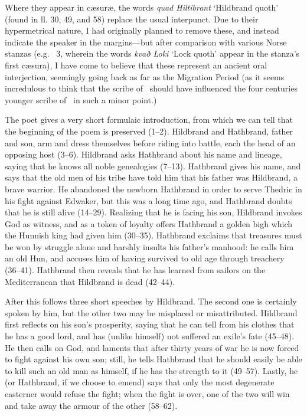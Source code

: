 Where they appear in cæsuræ, the words \emph{quad Hiltibrant} ‘Hildbrand quoth’ (found in ll. 30, 49, and 58) replace the usual interpunct. Due to their hypermetrical nature, I had originally planned to remove these, and instead indicate the speaker in the margins—but after comparison with various Norse stanzas (e.g. \Reginsmal\ 3, wherein the words \emph{kvað Loki} ‘Lock quoth’ appear in the stanza’s first cæsura), I have come to believe that these represent an ancient oral interjection, seemingly going back as far as the Migration Period (as it seems incredulous to think that the scribe of \HildMS\ should have influenced the four centuries younger scribe of \Regius\ in such a minor point.)


The poet gives a very short formulaic introduction, from which we can tell that the beginning of the poem is preserved (1–2). Hildbrand and Hathbrand, father and son, arm and dress themselves before riding into battle, each the head of an opposing host (3–6). Hildbrand asks Hathbrand about his name and lineage, saying that he knows all noble genealogies (7–13). Hathbrand gives his name, and says that the old men of his tribe have told him that his father was Hildbrand, a brave warrior. He abandoned the newborn Hathbrand in order to serve Thedric in his fight against Edwaker, but this was a long time ago, and Hathbrand doubts that he is still alive (14–29). Realizing that he is facing his son, Hildbrand invokes God as witness, and as a token of loyalty offers Hathbrand a golden bigh which the Hunnish king had given him (30–35). Hathbrand exclaims that treasures must be won by struggle alone and harshly insults his father’s manhood: he calls him an old Hun, and accuses him of having survived to old age through treachery (36–41). Hathbrand then reveals that he has learned from sailors on the Mediterranean that Hildbrand is dead (42–44).

After this follows three short speeches by Hildbrand. The second one is certainly spoken by him, but the other two may be misplaced or misattributed. Hildbrand first reflects on his son’s prosperity, saying that he can tell from his clothes that he has a good lord, and has (unlike himself) not suffered an exile’s fate (45–48). He then calls on God, and laments that after thirty years of war he is now forced to fight against his own son; still, he tells Hathbrand that he should easily be able to kill such an old man as himself, if he has the strength to it (49–57). Lastly, he (or Hathbrand, if we choose to emend) says that only the most degenerate easterner would refuse the fight; when the fight is over, one of the two will win and take away the armour of the other (58–62).

